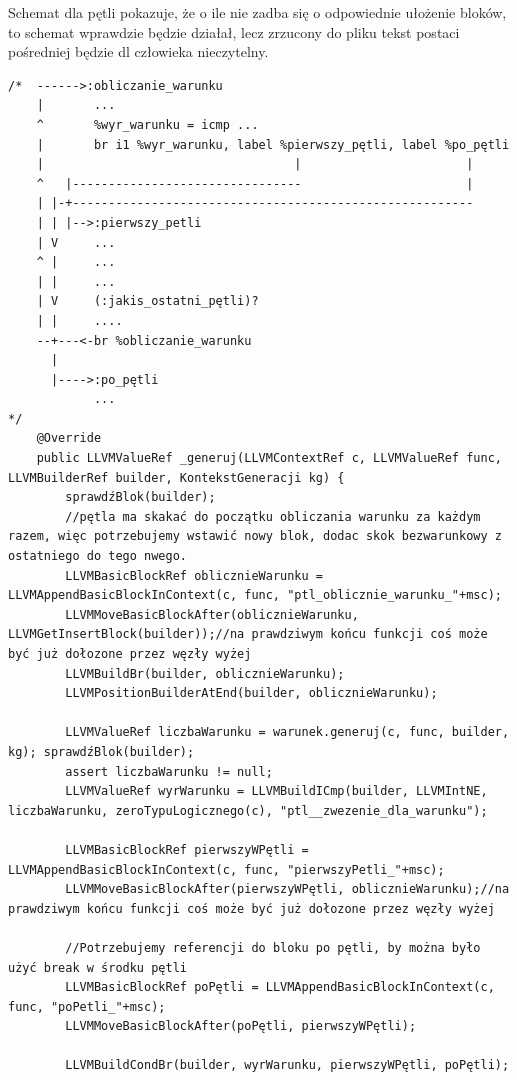 Schemat dla pętli pokazuje, że o ile nie zadba się o odpowiednie ułożenie bloków, to schemat wprawdzie będzie działał, lecz zrzucony do pliku tekst postaci pośredniej będzie dl człowieka nieczytelny.
\lstset{
    escapechar=`,
    breaklines=true
}
\begin{lstlisting}[basicstyle=\scriptsize]
/*  ------>:obliczanie_warunku
    |       ...
    ^       %wyr_warunku = icmp ...
    |       br i1 %wyr_warunku, label %pierwszy_pętli, label %po_pętli
    |                                   |                       |
    ^   |--------------------------------                       |
    | |-+--------------------------------------------------------
    | | |-->:pierwszy_petli
    | V     ...
    ^ |     ...
    | |     ...
    | V     (:jakis_ostatni_pętli)?
    | |     ....
    --+---<-br %obliczanie_warunku
      |
      |---->:po_pętli
            ...
*/
    @Override
    public LLVMValueRef _generuj(LLVMContextRef c, LLVMValueRef func, LLVMBuilderRef builder, KontekstGeneracji kg) {
        sprawdźBlok(builder);
        //pętla ma skakać do początku obliczania warunku za każdym razem, więc potrzebujemy wstawić nowy blok, dodac skok bezwarunkowy z ostatniego do tego nwego.
        LLVMBasicBlockRef oblicznieWarunku = LLVMAppendBasicBlockInContext(c, func, "ptl_oblicznie_warunku_"+msc);
        LLVMMoveBasicBlockAfter(oblicznieWarunku, LLVMGetInsertBlock(builder));//na prawdziwym końcu funkcji coś może być już dołozone przez węzły wyżej
        LLVMBuildBr(builder, oblicznieWarunku);
        LLVMPositionBuilderAtEnd(builder, oblicznieWarunku);

        LLVMValueRef liczbaWarunku = warunek.generuj(c, func, builder, kg); sprawdźBlok(builder);
        assert liczbaWarunku != null;
        LLVMValueRef wyrWarunku = LLVMBuildICmp(builder, LLVMIntNE, liczbaWarunku, zeroTypuLogicznego(c), "ptl__zwezenie_dla_warunku");

        LLVMBasicBlockRef pierwszyWPętli = LLVMAppendBasicBlockInContext(c, func, "pierwszyPetli_"+msc);
        LLVMMoveBasicBlockAfter(pierwszyWPętli, oblicznieWarunku);//na prawdziwym końcu funkcji coś może być już dołozone przez węzły wyżej

        //Potrzebujemy referencji do bloku po pętli, by można było użyć break w środku pętli
        LLVMBasicBlockRef poPętli = LLVMAppendBasicBlockInContext(c, func, "poPetli_"+msc);
        LLVMMoveBasicBlockAfter(poPętli, pierwszyWPętli);

        LLVMBuildCondBr(builder, wyrWarunku, pierwszyWPętli, poPętli);


\end{lstlisting}
